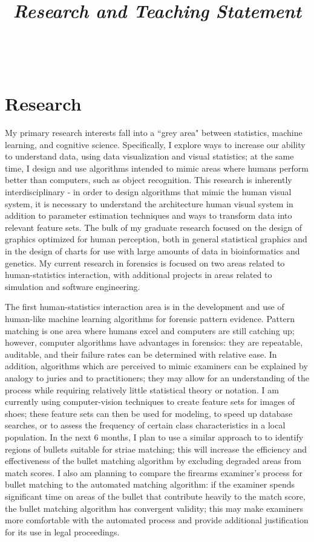\documentclass[12pt, letterpaper, sans]{moderncv}
\title{\emph{Research and Teaching Statement}}
\makeatletter
\newcommand{\makesimpletitle}{%
  \recomputeletterlengths%

  \begin{varwidth}[c]{.75\textwidth}
  \if@left\raggedright\fi%
      \if@right\raggedleft\fi%
      \ifthenelse{\equal{\@title}{}}{}{\titlestyle{\@title}}%
  \end{varwidth}\hfill
  \begin{varwidth}[c]{.25\textwidth}%
      \raggedleft%
      \addressfont\textcolor{color2}{%
        {\bfseries\upshape\@firstname~\@lastname}\\
        \ifthenelse{\isundefined{\@addressstreet}}{}{\makenewline\addresssymbol\@addressstreet%
          \ifthenelse{\equal{\@addresscity}{}}{}{\makenewline\@addresscity}%
          \ifthenelse{\equal{\@addresscountry}{}}{}{\makenewline\@addresscountry}}%
        \collectionloop{phones}{%
          \makenewline\csname\collectionloopkey phonesymbol\endcsname\collectionloopitem}%
        \ifthenelse{\isundefined{\@email}}{}{\makenewline\emailsymbol\emaillink{\@email}}%
        \ifthenelse{\isundefined{\@homepage}}{}{\makenewline\homepagesymbol\httplink{\@homepage}}%
        \ifthenelse{\isundefined{\@extrainfo}}{}{\makenewline\@extrainfo}}
    \end{varwidth}
}
\makeatother
\begin{document}
\makesimpletitle

\section{Research}

My primary research interests fall into a ``grey area" between statistics, machine learning, and cognitive science. Specifically, I explore ways to increase our ability to understand data, using data visualization and visual statistics; at the same time, I design and use algorithms intended to mimic areas where humans perform better than computers, such as object recognition. This research is inherently interdisciplinary - in order to design algorithms that mimic the human visual system, it is necessary to understand the architecture human visual system in addition to parameter estimation techniques and ways to transform data into relevant feature sets. The bulk of my graduate research focused on the design of graphics optimized for human perception, both in general statistical graphics and in the design of charts for use with large amounts of data in bioinformatics and genetics. My current research in forensics is focused on two areas related to human-statistics interaction, with additional projects in areas related to simulation and software engineering. 

The first human-statistics interaction area is in the development and use of human-like machine learning algorithms for forensic pattern evidence. Pattern matching is one area where humans excel and computers are still catching up; however, computer algorithms have advantages in forensics: they are repeatable, auditable, and their failure rates can be determined with relative ease. In addition, algorithms which are perceived to mimic examiners can be explained by analogy to juries and to practitioners; they may allow for an understanding of the process while requiring relatively little statistical theory or notation. I am currently using computer-vision techniques to create feature sets for images of shoes; these feature sets can then be used for modeling, to speed up database searches, or to assess the frequency of certain class characteristics in a local population. In the next 6 months, I plan to use a similar approach to to identify regions of bullets suitable for striae matching; this will increase the efficiency and effectiveness of the bullet matching algorithm by excluding degraded areas from match scores. I also am planning to compare the firearms examiner's process for bullet matching to the automated matching algorithm: if the examiner spends significant time on areas of the bullet that contribute heavily to the match score, the bullet matching algorithm has convergent validity; this may make examiners more comfortable with the automated process and provide additional justification for its use in legal proceedings. 
\end{document}

